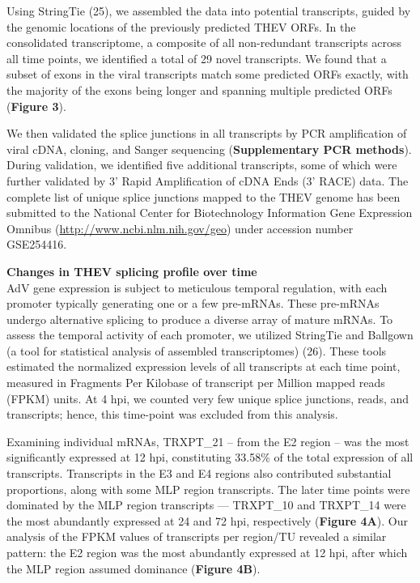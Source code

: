 \documentclass[
]{article}
\begin{document}
Using StringTie (25), we assembled the data into potential transcripts,
guided by the genomic locations of the previously predicted THEV ORFs.
In the consolidated transcriptome, a composite of all non-redundant
transcripts across all time points, we identified a total of 29 novel
transcripts. We found that a subset of exons in the viral transcripts
match some predicted ORFs exactly, with the majority of the exons being
longer and spanning multiple predicted ORFs (\textbf{Figure 3}).

We then validated the splice junctions in all transcripts by PCR
amplification of viral cDNA, cloning, and Sanger sequencing
(\textbf{Supplementary PCR methods}). During validation, we identified
five additional transcripts, some of which were further validated by 3'
Rapid Amplification of cDNA Ends (3' RACE) data. The complete list of
unique splice junctions mapped to the THEV genome has been submitted to
the National Center for Biotechnology Information Gene Expression
Omnibus (\url{http://www.ncbi.nlm.nih.gov/geo}) under accession number
GSE254416.

\textbf{Changes in THEV splicing profile over time}\\
AdV gene expression is subject to meticulous temporal regulation, with
each promoter typically generating one or a few pre-mRNAs. These
pre-mRNAs undergo alternative splicing to produce a diverse array of
mature mRNAs. To assess the temporal activity of each promoter, we
utilized StringTie and Ballgown (a tool for statistical analysis of
assembled transcriptomes) (26). These tools estimated the normalized
expression levels of all transcripts at each time point, measured in
Fragments Per Kilobase of transcript per Million mapped reads (FPKM)
units. At 4 hpi, we counted very few unique splice junctions, reads, and
transcripts; hence, this time-point was excluded from this analysis.

Examining individual mRNAs, TRXPT\_21 -- from the E2 region -- was the
most significantly expressed at 12 hpi, constituting 33.58\% of the
total expression of all transcripts. Transcripts in the E3 and E4
regions also contributed substantial proportions, along with some MLP
region transcripts. The later time points were dominated by the MLP
region transcripts --- TRXPT\_10 and TRXPT\_14 were the most abundantly
expressed at 24 and 72 hpi, respectively (\textbf{Figure 4A}). Our
analysis of the FPKM values of transcripts per region/TU revealed a
similar pattern: the E2 region was the most abundantly expressed at 12
hpi, after which the MLP region assumed dominance (\textbf{Figure 4B}).
\end{document}
